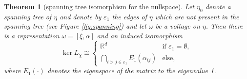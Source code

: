 \documentclass[10pt,reqno]{amsart}
\numberwithin{equation}{section}
\theoremstyle{bfnote}
\newtheorem{theorem}{Theorem}[section]
\theoremstyle{bfdef}
\newcommand{\R}{\mathbb{R}}
\newcommand{\veps}{\varepsilon}
\providecommand\gt; %
\renewcommand{\gt}{\xi}
\providecommand\a; %
\renewcommand{\a}{\alpha}
\providecommand\E; %
\renewcommand{\E}{E}
\providecommand\hgen; %
\renewcommand{\hgen}{L}
\providecommand\vg; %
\renewcommand{\vg}{\chi}
\begin{document}
		\begin{theorem}[spanning tree isomorphism for the nullspace]\label{thm:spanning-isom}
			Let $\eta_0$ denote a spanning tree of $\eta$ and denote by $\veps_1$ the edges of $\eta$ which are not present in the spanning tree (see Figure \ref{fig:spanning}) and let $\omega$ be a voltage on $\eta$.  Then there is a representation $\omega = [\gt,\a]$ and an induced isomorphism
			\begin{equation}
				\ker \hgen_{\vg} \cong
				\begin{cases}
					\R^{d} & \text{if }\veps_1 = \emptyset, \\
					\bigcap_{ i > j \in \veps_1}
					\E_1(\a_{ij}) &\text{else},
				\end{cases} 
			\end{equation}
			where $\E_1(\cdot)$ denotes the eigenspace of the matrix to the eigenvalue 1.
		\end{theorem}
\end{document}
